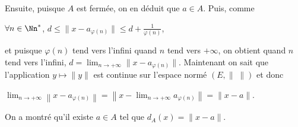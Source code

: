 {\begin{enumerate}
{Ensuite, puisque $A$ est fermée, on en déduit que $a\in A$. Puis, comme

\begin{center}
$\forall n\in\Nn^*$, $d\leqslant\|x-a_{\varphi(n)}\| \leqslant d+ \frac{1}{\varphi(n)}$,
\end{center}

et puisque $\varphi(n)$ tend vers l'infini quand $n$ tend vers $+\infty$, on obtient quand $n$ tend vers l'infini, $d =\lim_{n \rightarrow +\infty}\|x-a_{\varphi(n)}\|$. Maintenant on sait que l'application $y\mapsto\|y\|$ est continue sur l'espace normé $(E,\|\;\|)$ et donc 

\begin{center}
$\lim_{n \rightarrow +\infty}\left\|x-a_{\varphi(n)}\right\|=\left\|x-\lim_{n \rightarrow +\infty}a_{\varphi(n)}\right\|=\|x-a\|$.
\end{center}

On a montré qu'il existe $a\in A$ tel que $d_A(x)=\|x-a\|$.}
\end{enumerate}
}
